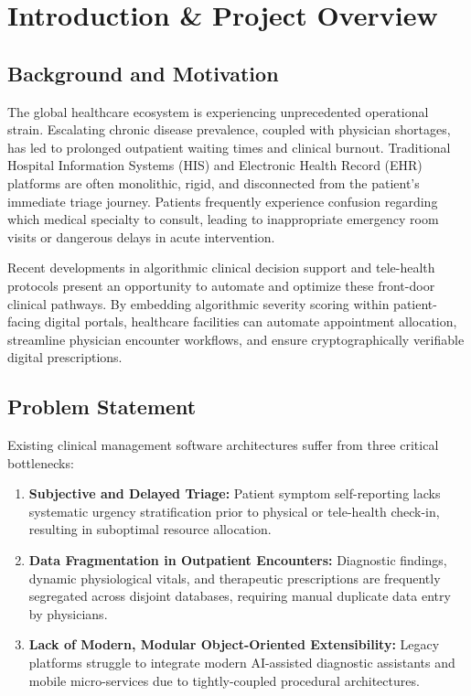 \documentclass[11pt,a4paper]{article}
\begin{document}
\section{Introduction \& Project Overview}

\subsection{Background and Motivation}
The global healthcare ecosystem is experiencing unprecedented operational strain. Escalating chronic disease prevalence, coupled with physician shortages, has led to prolonged outpatient waiting times and clinical burnout. Traditional Hospital Information Systems (HIS) and Electronic Health Record (EHR) platforms are often monolithic, rigid, and disconnected from the patient's immediate triage journey. Patients frequently experience confusion regarding which medical specialty to consult, leading to inappropriate emergency room visits or dangerous delays in acute intervention.

Recent developments in algorithmic clinical decision support and tele-health protocols present an opportunity to automate and optimize these front-door clinical pathways. By embedding algorithmic severity scoring within patient-facing digital portals, healthcare facilities can automate appointment allocation, streamline physician encounter workflows, and ensure cryptographically verifiable digital prescriptions.

\subsection{Problem Statement}
Existing clinical management software architectures suffer from three critical bottlenecks:
\begin{enumerate}
    \item \textbf{Subjective and Delayed Triage:} Patient symptom self-reporting lacks systematic urgency stratification prior to physical or tele-health check-in, resulting in suboptimal resource allocation.
    \item \textbf{Data Fragmentation in Outpatient Encounters:} Diagnostic findings, dynamic physiological vitals, and therapeutic prescriptions are frequently segregated across disjoint databases, requiring manual duplicate data entry by physicians.
    \item \textbf{Lack of Modern, Modular Object-Oriented Extensibility:} Legacy platforms struggle to integrate modern AI-assisted diagnostic assistants and mobile micro-services due to tightly-coupled procedural architectures.
\end{enumerate}
\end{document}
